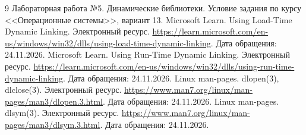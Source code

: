 \begin{thebibliography}{9}
 Лабораторная работа №5. Динамические библиотеки. Условие задания по курсу <<Операционные системы>>, вариант 13.
 Microsoft Learn. Using Load-Time Dynamic Linking. Электронный ресурс. \url{https://learn.microsoft.com/en-us/windows/win32/dlls/using-load-time-dynamic-linking}. Дата обращения: 24.11.2026.
 Microsoft Learn. Using Run-Time Dynamic Linking. Электронный ресурс. \url{https://learn.microsoft.com/en-us/windows/win32/dlls/using-run-time-dynamic-linking}. Дата обращения: 24.11.2026.
 Linux man-pages. dlopen(3), dlclose(3). Электронный ресурс. \url{https://www.man7.org/linux/man-pages/man3/dlopen.3.html}. Дата обращения: 24.11.2026.
 Linux man-pages. dlsym(3). Электронный ресурс. \url{https://www.man7.org/linux/man-pages/man3/dlsym.3.html}. Дата обращения: 24.11.2026.
\end{thebibliography}
